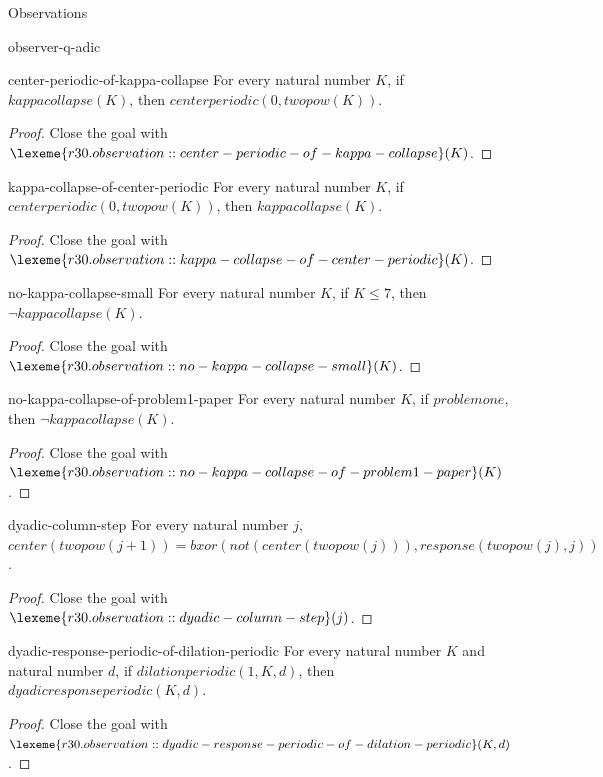 \begin{lexlean}{Observations}
\begin{section}{observer-q-adic}
\begin{theorem}{center-periodic-of-kappa-collapse}
For every natural number \(K\), if \(kappacollapse(K)\), then \(centerperiodic(0, twopow(K))\).
\begin{proof}
Close the goal with \(\lexeme{r30.observation::center-periodic-of-kappa-collapse}(K)\).
\end{proof}
\end{theorem}

\begin{theorem}{kappa-collapse-of-center-periodic}
For every natural number \(K\), if \(centerperiodic(0, twopow(K))\), then \(kappacollapse(K)\).
\begin{proof}
Close the goal with \(\lexeme{r30.observation::kappa-collapse-of-center-periodic}(K)\).
\end{proof}
\end{theorem}

\begin{theorem}{no-kappa-collapse-small}
For every natural number \(K\), if \(K ≤ 7\), then \(¬ kappacollapse(K)\).
\begin{proof}
Close the goal with \(\lexeme{r30.observation::no-kappa-collapse-small}(K)\).
\end{proof}
\end{theorem}

\begin{theorem}{no-kappa-collapse-of-problem1-paper}
For every natural number \(K\), if \(problemone\), then \(¬ kappacollapse(K)\).
\begin{proof}
Close the goal with \(\lexeme{r30.observation::no-kappa-collapse-of-problem1-paper}(K)\).
\end{proof}
\end{theorem}

\begin{theorem}{dyadic-column-step}
For every natural number \(j\), \(center(twopow(j + 1)) = bxor(not(center(twopow(j))), response(twopow(j), j))\).
\begin{proof}
Close the goal with \(\lexeme{r30.observation::dyadic-column-step}(j)\).
\end{proof}
\end{theorem}

\begin{theorem}{dyadic-response-periodic-of-dilation-periodic}
For every natural number \(K\) and natural number \(d\), if \(dilationperiodic(1, K, d)\), then \(dyadicresponseperiodic(K, d)\).
\begin{proof}
Close the goal with \(\lexeme{r30.observation::dyadic-response-periodic-of-dilation-periodic}(K, d)\).
\end{proof}
\end{theorem}


\end{section}
\end{lexlean}
